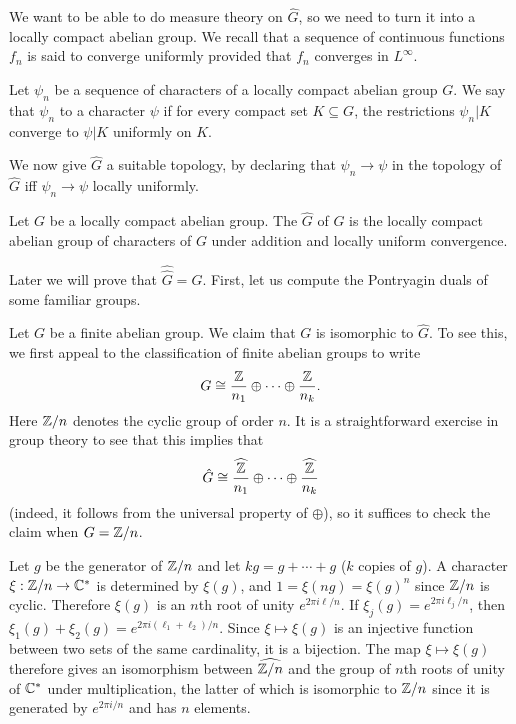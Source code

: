 We want to be able to do measure theory on $\hat G$, so we need to turn it into a locally compact abelian group.
We recall that a sequence of continuous functions $f_n$ is said to converge uniformly provided that $f_n$ converges in $L^\infty$.
\begin{definition}
Let $\psi_n$ be a sequence of characters of a locally compact abelian group $G$.
We say that $\psi_n$  to a character $\psi$ if for every compact set $K \subseteq G$, the restrictions $\psi_n|K$ converge to $\psi|K$ uniformly on $K$.
\end{definition}
We now give $\hat G$ a suitable topology, by declaring that $\psi_n \to \psi$ in the topology of $\hat G$ iff $\psi_n \to \psi$ locally uniformly.

\begin{definition}
Let $G$ be a locally compact abelian group.
The  $\hat G$ of $G$ is the locally compact abelian group of characters of $G$ under addition and locally uniform convergence.
\end{definition}

Later we will prove that $\widehat{\hat G} = G$. First, let us compute the Pontryagin duals of some familiar groups.

\begin{example}
Let $G$ be a finite abelian group. We claim that $G$ is isomorphic to $\hat G$. To see this, we first appeal to the classification of finite abelian groups to write
$$G \cong \frac{\mathbb{Z}}{n_1} \oplus \cdots \oplus \frac{\mathbb{Z}}{n_k}.$$
Here $\mathbb{Z}/n$ denotes the cyclic group of order $n$.
It is a straightforward exercise in group theory to see that this implies that
$$\hat G \cong \widehat{\frac{\mathbb{Z}}{n_1}} \oplus \cdots \oplus \widehat{\frac{\mathbb{Z}}{n_k}}$$
(indeed, it follows from the universal property of $\oplus$), so it suffices to check the claim when $G = \mathbb{Z}/n$.

Let $g$ be the generator of $\mathbb{Z}/n$ and let $kg = g + \cdots + g$ ($k$ copies of $g$).
A character $\xi: \mathbb{Z}/n \to \mathbb{C}^*$ is determined by $\xi(g)$, and $1 = \xi(ng) = \xi(g)^n$ since $\mathbb{Z}/n$ is cyclic.
Therefore $\xi(g)$ is an $n$th root of unity $e^{2\pi i\ell/n}$.
If $\xi_j(g) = e^{2\pi i \ell_j/n}$, then $\xi_1(g) + \xi_2(g) = e^{2\pi i(\ell_1 + \ell_2)/n}$.
Since $\xi \mapsto \xi(g)$ is an injective function between two sets of the same cardinality, it is a bijection.
The map $\xi \mapsto \xi(g)$ therefore gives an isomorphism between $\widehat{\mathbb{Z}/n}$ and the group of $n$th roots of unity of $\mathbb{C}^*$ under multiplication, the latter of which is isomorphic to $\mathbb{Z}/n$ since it is generated by $e^{2\pi i/n}$ and has $n$ elements.
\end{example}


